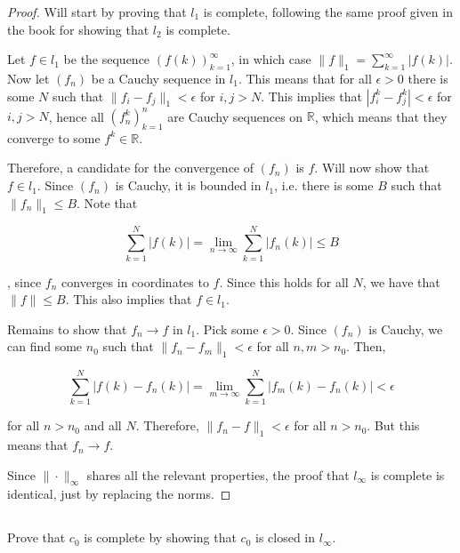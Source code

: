 \begin{proof}
Will start by proving that $l_1$ is complete, following the same proof given in the book for showing that $l_2$ is complete.

Let $f \in l_1$ be the sequence $(f(k))_{k=1}^\infty$, in which case $\|f\|_1 = \sum_{k=1}^\infty |f(k)|$. Now let $(f_n)$ be a Cauchy sequence in $l_1$. This means that for all $\epsilon > 0$ there is some $N$ such that $\|f_i - f_j\|_1 < \epsilon$ for $i,j>N$. This implies that $|f_i^k - f_j^k| < \epsilon$ for $i,j>N$, hence all $(f_n^k)_{k=1}^n$ are Cauchy sequences on $\mathbb{R}$, which means that they converge to some $f^k \in \mathbb{R}$.

\vspace{1em}

Therefore, a candidate for the convergence of $(f_n)$ is $f$. Will now show that $f \in l_1$. Since $(f_n)$ is Cauchy, it is bounded in $l_1$, i.e. there is some $B$ such that $\|f_n\|_1 \leq B$. Note that

$$ \sum_{k=1}^N |f(k)| = \lim_{n \rightarrow \infty} \sum_{k=1}^N |f_n(k)| \leq B$$

, since $f_n$ converges in coordinates to $f$. Since this holds for all $N$, we have that $\|f\| \leq B$. This also implies that $f \in l_1$.

\vspace{1em}

Remains to show that $f_n \rightarrow f$ in $l_1$. Pick some $\epsilon > 0$. Since $(f_n)$ is Cauchy, we can find some $n_0$ such that $\|f_n - f_m\|_1 < \epsilon$ for all $n,m>n_0$. Then,

$$ \sum_{k=1}^N |f(k) - f_n(k)| = \lim_{m \rightarrow \infty} \sum_{k=1}^N |f_m(k) - f_n(k)| < \epsilon$$


for all $n > n_0$ and all $N$. Therefore, $\|f_n - f\|_1 < \epsilon$ for all $n > n_0$. But this means that $f_n \rightarrow f$.

\vspace{1em}

Since $\|\cdot\|_\infty$ shares all the relevant properties, the proof that $l_\infty$ is complete is identical, just by replacing the norms. 

\end{proof}

\subsection{} Prove that $c_0$ is complete by showing that $c_0$ is closed in $l_\infty$.

